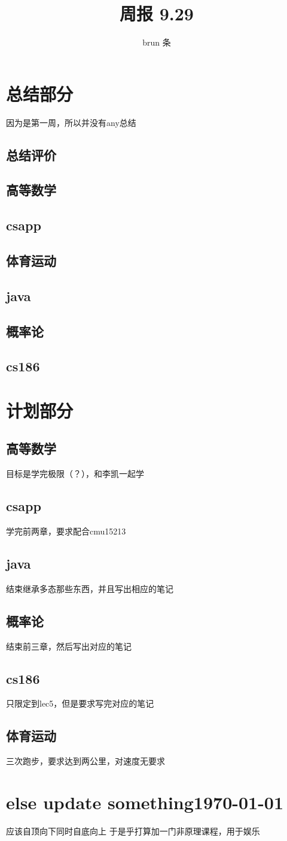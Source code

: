 \documentclass[a4paper,11pt]{ctexrep}
\title{周报 9.29}
\author{brun 条}
\date{}
\begin{document}
\maketitle
\section{总结部分}
因为是第一周，所以并没有any总结
\subsection{总结评价}
\subsection{高等数学}
\subsection{csapp}
\subsection{体育运动}
\subsection{java}
\subsection{概率论}
\subsection{cs186}
\section{计划部分}
\subsection{高等数学}
目标是学完极限（？），和李凯一起学
\subsection{csapp}
学完前两章，要求配合cmu15213
\subsection{java}
结束继承多态那些东西，并且写出相应的笔记
\subsection{概率论}
结束前三章，然后写出对应的笔记
\subsection{cs186}
只限定到lec5，但是要求写完对应的笔记
\subsection{体育运动}
三次跑步，要求达到两公里，对速度无要求
\section{else update something\today}
应该自顶向下同时自底向上
于是乎打算加一门非原理课程，用于娱乐
\end{document}
